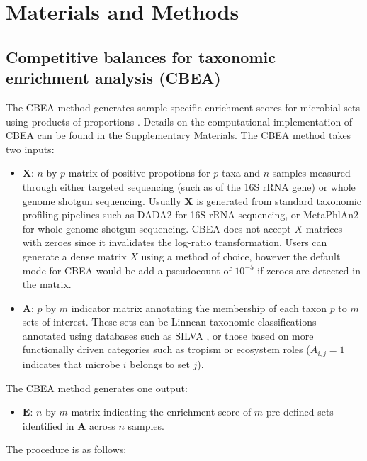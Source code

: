 \documentclass[10pt,letterpaper]{article}
\begin{document}
\section*{Materials and Methods} \label{methods}
\subsection*{Competitive balances for taxonomic enrichment analysis (CBEA)}
The CBEA method generates sample-specific enrichment scores for microbial sets using products of proportions \cite{egozcue2003}. Details on the computational implementation of CBEA can be found in the Supplementary Materials. The CBEA method takes two inputs:  
\begin{itemize}
    \item $\mathbf{X}$: $n$ by $p$ matrix of positive propotions for $p$ taxa and $n$ samples measured through either targeted sequencing (such as of the 16S rRNA gene) or whole genome shotgun sequencing. Usually $\mathbf{X}$ is generated from standard taxonomic profiling pipelines such as DADA2 \cite{callahan2016} for 16S rRNA sequencing, or MetaPhlAn2 \cite{truong2015} for whole genome shotgun sequencing. CBEA does not accept $X$ matrices with zeroes since it invalidates the log-ratio transformation. Users can generate a dense matrix $X$ using a method of choice, however the default mode for CBEA would be add a pseudocount of $10^{-5}$ if zeroes are detected in the matrix. 
    \item $\mathbf{A}$: $p$ by $m$ indicator matrix annotating the membership of each taxon $p$ to $m$ sets of interest. These sets can be Linnean taxonomic classifications annotated using databases such as SILVA \cite{quast2013}, or those based on more functionally driven categories such as tropism or ecosystem roles ($A_{i,j} = 1$ indicates that microbe $i$ belongs to set $j$). 
\end{itemize}
The CBEA method generates one output:  
\begin{itemize} 
    \item $\mathbf{E}$: $n$ by $m$ matrix indicating the enrichment score of $m$ pre-defined sets identified in $\mathbf{A}$ across $n$ samples. 
\end{itemize}
The procedure is as follows:  
\end{document}
